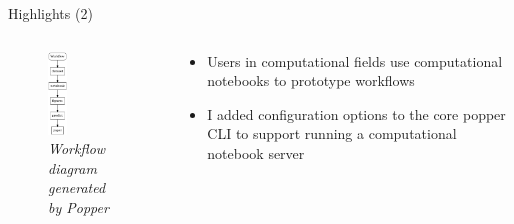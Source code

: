 \documentclass[10pt]{beamer}
\begin{document}
\begin{frame}{Highlights (2)}
    \begin{columns}
        \begin{column}{0.5\textwidth} 
            \begin{center}
                \begin{figure}
                    \includegraphics[width=0.25\textwidth]{images/workflow.png}
                    \caption*{{\sl Workflow diagram generated by Popper}}
                \end{figure}
            \end{center}
        \end{column}
        \begin{column}{0.5\textwidth}
            \begin{itemize}
                \item Users in computational fields use computational
                notebooks to prototype workflows 
                \item I added configuration options to the core \alert{popper} CLI 
                to support running a computational notebook server
            \end{itemize}
        \end{column}
    \end{columns}  

\end{frame}
\end{document}
